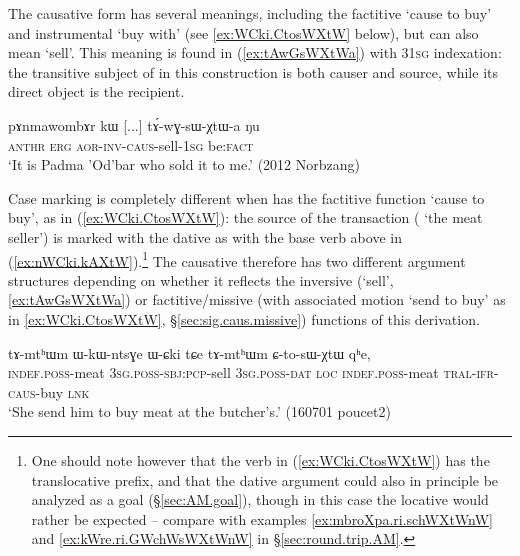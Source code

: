 The causative form  has several meanings, including the factitive `cause to buy' and instrumental  `buy with' (see \ref{ex:WCki.CtosWXtW} below), but can also mean `sell'. This meaning is found in (\ref{ex:tAwGsWXtWa}) with 3\fl{}\textsc{1sg} indexation: the transitive subject of  in this construction is both causer and source, while its direct object is the recipient.

\begin{exe}
\ex \label{ex:tAwGsWXtWa}
\gll  pɤnmawombɤr kɯ [...] tɤ́-wɣ-sɯ-χtɯ-a ŋu \\
\textsc{anthr} \textsc{erg} { } \textsc{aor}-\textsc{inv}-\textsc{caus}-sell-\textsc{1sg} be:\textsc{fact} \\
\glt `It is Padma 'Od'bar who sold it to me.' (2012 Norbzang)
\end{exe} 

Case marking is completely different when  has the factitive function `cause to buy', as in (\ref{ex:WCki.CtosWXtW}): the source of the transaction ( `the meat seller') is marked with the dative as with the base verb above in (\ref{ex:nWCki.kAXtW}).\footnote{One should note however that the verb in (\ref{ex:WCki.CtosWXtW}) has the translocative prefix, and that the dative argument could also in principle be analyzed as a goal (§\ref{sec:AM.goal}), though in this case the locative  would rather be expected -- compare with examples \ref{ex:mbroXpa.ri.schWXtWnW}  and \ref{ex:kWre.ri.GWchWsWXtWnW} in §\ref{sec:round.trip.AM}.} The causative   therefore has two different argument structures depending on whether it reflects the inversive (`sell', \ref{ex:tAwGsWXtWa}) or factitive/missive (with associated motion `send to buy' as in \ref{ex:WCki.CtosWXtW}, §\ref{sec:sig.caus.missive}) functions of this derivation.

\begin{exe}
\ex \label{ex:WCki.CtosWXtW}
\gll tɤ-mtʰɯm ɯ-kɯ-ntsɣe ɯ-ɕki tɕe tɤ-mtʰɯm ɕ-to-sɯ-χtɯ qʰe, \\
\textsc{indef}.\textsc{poss}-meat \textsc{3sg}.\textsc{poss}-\textsc{sbj}:\textsc{pcp}-sell \textsc{3sg}.\textsc{poss}-\textsc{dat} \textsc{loc} \textsc{indef}.\textsc{poss}-meat \textsc{tral}-\textsc{ifr}-\textsc{caus}-buy \textsc{lnk} \\
\glt `She send him to buy meat at the butcher's.' (160701 poucet2)
\end{exe}

